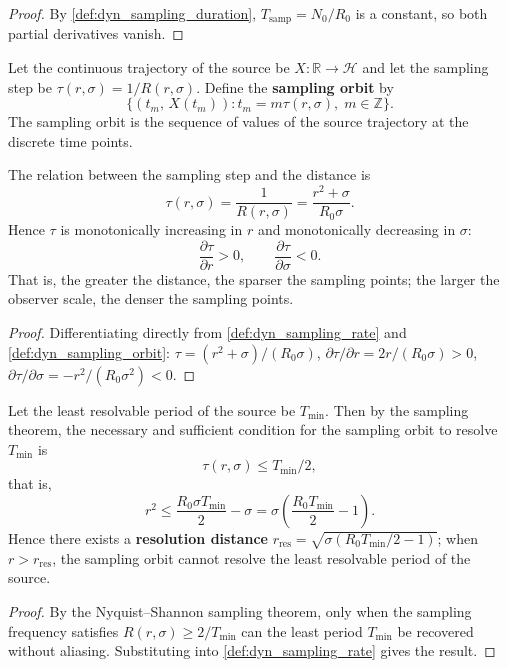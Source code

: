 \begin{proof}
By \cref{def:dyn_sampling_duration}, $T_{\text{samp}}=N_0/R_0$ is a constant, so both partial derivatives vanish.
\end{proof}

\begin{definition}\label{def:dyn_sampling_orbit}
Let the continuous trajectory of the source be $X:\mathbb R\to\mathcal H$ and let the sampling step be $\tau(r,\sigma)=1/R(r,\sigma)$. Define the \textbf{sampling orbit} by
\[
\{(t_m,\,X(t_m)):t_m=m\tau(r,\sigma),\;m\in\mathbb Z\}.
\]
The sampling orbit is the sequence of values of the source trajectory at the discrete time points.
\end{definition}

\begin{proposition}\label{prop:dyn_sampling_orbit_spacing}
The relation between the sampling step and the distance is
\[
\tau(r,\sigma)=\frac{1}{R(r,\sigma)}=\frac{r^2+\sigma}{R_0\sigma}.
\]
Hence $\tau$ is monotonically increasing in $r$ and monotonically decreasing in $\sigma$:
\[
\frac{\partial\tau}{\partial r}>0,\qquad
\frac{\partial\tau}{\partial\sigma}<0.
\]
That is, the greater the distance, the sparser the sampling points; the larger the observer scale, the denser the sampling points.
\end{proposition}

\begin{proof}
Differentiating directly from \cref{def:dyn_sampling_rate} and \cref{def:dyn_sampling_orbit}: $\tau=(r^2+\sigma)/(R_0\sigma)$, $\partial\tau/\partial r=2r/(R_0\sigma)>0$, $\partial\tau/\partial\sigma=-r^2/(R_0\sigma^2)<0$.
\end{proof}

\begin{theorem}\label{thm:dyn_sampling_resolution}
Let the least resolvable period of the source be $T_{\min}$. Then by the sampling theorem, the necessary and sufficient condition for the sampling orbit to resolve $T_{\min}$ is
\[
\tau(r,\sigma)\le T_{\min}/2,
\]
that is,
\[
r^2\le\frac{R_0\sigma T_{\min}}{2}-\sigma=\sigma\left(\frac{R_0T_{\min}}{2}-1\right).
\]
Hence there exists a \textbf{resolution distance} $r_{\text{res}}=\sqrt{\sigma(R_0T_{\min}/2-1)}$; when $r>r_{\text{res}}$, the sampling orbit cannot resolve the least resolvable period of the source.
\end{theorem}

\begin{proof}
By the Nyquist--Shannon sampling theorem, only when the sampling frequency satisfies $R(r,\sigma)\ge 2/T_{\min}$ can the least period $T_{\min}$ be recovered without aliasing. Substituting into \cref{def:dyn_sampling_rate} gives the result.
\end{proof}


